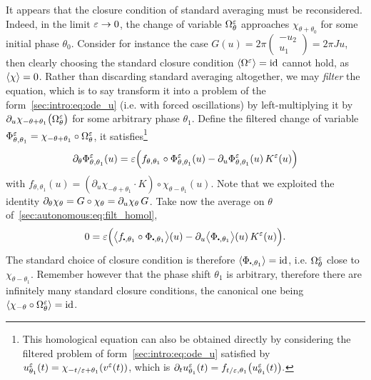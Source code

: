 It appears that the closure condition of standard averaging must be
reconsidered. Indeed, in the limit $\varepsilon \rightarrow 0$, the change of
variable $\Omega^\varepsilon_\theta$ approaches $\chi_{\theta+\theta_0}$ for some
initial phase $\theta_0$. Consider for instance the case $G(u) =
2\pi\begin{pmatrix} -u_2 \\ u_1 \end{pmatrix} = 2\pi Ju$, then clearly
choosing the standard closure condition $\langle \Omega^\varepsilon \rangle = \operatorname{id}$ cannot
hold, as $\langle \chi \rangle = 0$. 
%
Rather than discarding standard averaging altogether, we may
\textit{filter} the equation, which is to say transform it into a
problem of the form~\eqref{sec:intro:eq:ode_u} (i.e. with forced
oscillations) by left-multiplying it by $\partial_u \chi_{-\theta+\theta_1}
\big(\Omega^\varepsilon_\theta \big)$ for some arbitrary phase $\theta_1$.
Define the filtered change of variable $\Phi^\varepsilon_{\theta, \theta_1} =
\chi_{-\theta + \theta_1} \circ \Omega^\varepsilon_{\theta}$, it
satisfies\footnote{ %
  This homological equation can also be obtained directly by considering
  the filtered problem of form~\eqref{sec:intro:eq:ode_u} satisfied by
  $u^\varepsilon_{\theta_1}(t) = \chi_{-t/\varepsilon+\theta_1}(v^\varepsilon(t))$, which is $
  \partial_t u^\varepsilon_{\theta_1}(t) = f_{t/\varepsilon, \theta_1} \big( u^\varepsilon
  _{\theta_1} (t) \big). $ %
}
\begin{equation} \label{sec:autonomous:eq:filt_homol}
  \partial_\theta \Phi^\varepsilon_{\theta, \theta_1} (u)
  = \varepsilon\Big( f_{\theta, \theta_1} \circ \Phi^\varepsilon_{\theta, \theta_1}(u) - \partial_u \Phi^\varepsilon_{\theta, \theta_1}(u) \, K^\varepsilon(u) \Big) 
\end{equation}
with $f_{\theta, \theta_1}(u) = \left(\partial_u \chi_{-\theta +
\theta_1}\cdot K \right) \circ \chi_{\theta-\theta_1}(u)$. Note that we
exploited the identity $\partial_\theta \chi_\theta = G \circ \chi_\theta =
\partial_u \chi_\theta \, G$. 
%
Take now the average on $\theta$ of~\eqref{sec:autonomous:eq:filt_homol},
\begin{equation} \label{sec:autonumous:eq:filt_homol_avg}
  0 = \eps\Big( 
    \bLL f_{\bigcdot, \theta_1}  \circ \Phi_{\bigcdot, \theta_1} \bRR (u) 
    - \pa_u \bLL \Phi_{\bigcdot, \theta_1} \bRR (u) \, K^\eps(u) 
  \Big) . 
\end{equation}
The standard choice of closure condition is therefore $\LL
\Phi_{\bigcdot, \theta_1} \RR = \id$, i.e. $\Omega^\varepsilon_\theta$ close to
$\chi_{\theta - \theta_1}$. Remember however that the phase shift
$\theta_1$ is arbitrary, therefore there are infinitely many standard
closure conditions, the canonical one being $\langle \chi_{-\theta} \circ
\Omega^\varepsilon_\theta \rangle = \operatorname{id}$. 


